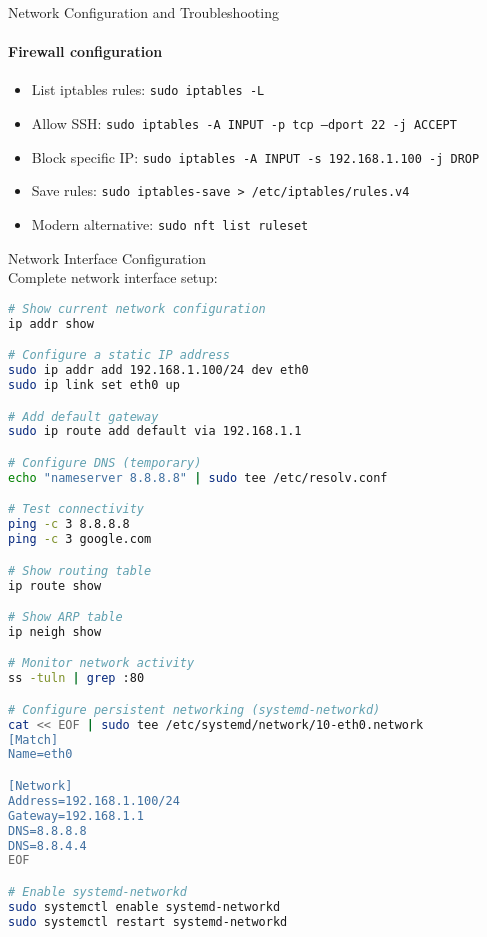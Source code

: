 \begin{KR}{Network Configuration and Troubleshooting}
    \paragraph{Firewall configuration}
    \begin{itemize}
        \item List iptables rules: \texttt{sudo iptables -L}
        \item Allow SSH: \texttt{sudo iptables -A INPUT -p tcp --dport 22 -j ACCEPT}
        \item Block specific IP: \texttt{sudo iptables -A INPUT -s 192.168.1.100 -j DROP}
        \item Save rules: \texttt{sudo iptables-save > /etc/iptables/rules.v4}
        \item Modern alternative: \texttt{sudo nft list ruleset}
    \end{itemize}
\end{KR}

\begin{example2}{Network Interface Configuration}\\
    Complete network interface setup:
    
\begin{lstlisting}[language=bash, style=basesmol]
# Show current network configuration
ip addr show

# Configure a static IP address
sudo ip addr add 192.168.1.100/24 dev eth0
sudo ip link set eth0 up

# Add default gateway
sudo ip route add default via 192.168.1.1

# Configure DNS (temporary)
echo "nameserver 8.8.8.8" | sudo tee /etc/resolv.conf

# Test connectivity
ping -c 3 8.8.8.8
ping -c 3 google.com

# Show routing table
ip route show

# Show ARP table
ip neigh show

# Monitor network activity
ss -tuln | grep :80

# Configure persistent networking (systemd-networkd)
cat << EOF | sudo tee /etc/systemd/network/10-eth0.network
[Match]
Name=eth0

[Network]
Address=192.168.1.100/24
Gateway=192.168.1.1
DNS=8.8.8.8
DNS=8.8.4.4
EOF

# Enable systemd-networkd
sudo systemctl enable systemd-networkd
sudo systemctl restart systemd-networkd
\end{lstlisting}
\end{example2}

